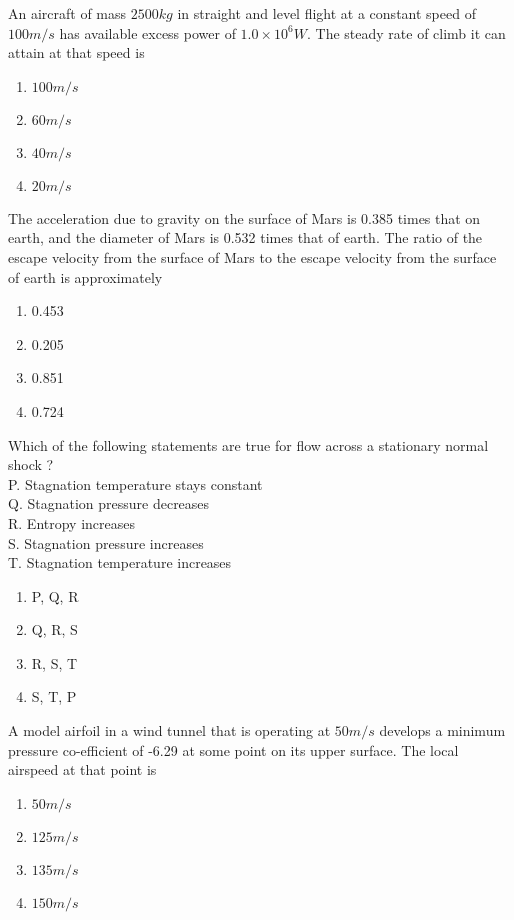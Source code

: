	\item
	An aircraft of mass $2500 kg$ in straight and level flight at a constant speed of $100 m/s$ has available excess power of $1.0 \times 10^6 W$. The steady rate of climb it can attain at that speed is 
		\begin{enumerate}
			\item $100 m/s$
			\item $60 m/s$
			\item $40 m/s$
			\item $20 m/s$
		\end{enumerate}
	\item
	The acceleration due to gravity on the surface of Mars is 0.385 times that on earth, and the diameter of Mars is 0.532 times that of earth. The ratio of the escape velocity from the surface of Mars to the escape velocity from the surface of earth is approximately
		\begin{enumerate}
			\item 0.453
			\item 0.205
			\item 0.851
			\item 0.724
		\end{enumerate}
	\item
	Which of the following statements are true for flow across a stationary normal shock ? \\
	P.      Stagnation temperature stays constant \\
	Q.	Stagnation pressure decreases \\
	R.	Entropy increases \\
	S.	Stagnation pressure increases \\
	T.	Stagnation temperature increases
		\begin{enumerate}
			\item P, Q, R
			\item Q, R, S
			\item R, S, T
			\item S, T, P
		\end{enumerate}
	\item
	A model airfoil in a wind tunnel that is operating at $50 m/s$ develops a minimum pressure co-efficient of -6.29 at some point on its upper surface. The local airspeed at that point is 
		\begin{enumerate}
			\item $50 m/s$
			\item $125 m/s$
			\item $135 m/s$
			\item $150 m/s$
		\end{enumerate}
